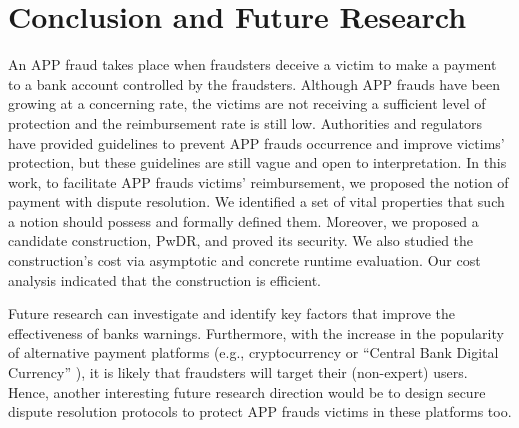 
 \vspace{-3mm}
\section{Conclusion and Future Research}\label{sec::conclusion}

An APP fraud takes place when fraudsters deceive a victim to make a payment to a bank account controlled by the fraudsters. Although APP frauds have been growing at a concerning rate, the victims are not receiving a sufficient level of protection and the reimbursement rate is still low. Authorities and regulators have provided guidelines to prevent APP frauds occurrence and improve victims’ protection, but these guidelines are still vague and open to interpretation. In this work, to facilitate APP frauds victims’ reimbursement,  we proposed the notion of payment with dispute resolution. We identified a set of vital properties that such a notion should possess and formally defined them. Moreover,  we proposed a candidate construction, PwDR, and proved its security.  We also studied the construction's cost via asymptotic and concrete runtime evaluation. Our cost analysis indicated that the construction is efficient. 



Future research can investigate and identify key factors that improve the effectiveness of banks warnings.  Furthermore, with the increase in the popularity of alternative payment platforms (e.g.,  cryptocurrency or ``Central Bank Digital Currency'' \cite{CBDC}), it is likely that fraudsters will target their (non-expert) users. Hence, another interesting future research direction would be to design secure dispute resolution protocols to protect  APP frauds victims in these platforms too. 



